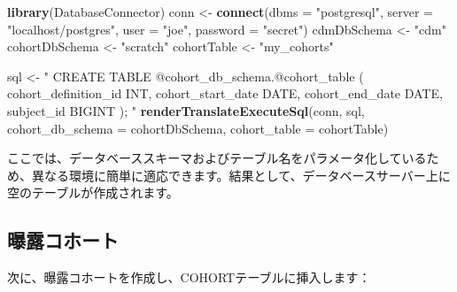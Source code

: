 \documentclass[
  11pt]{book}
\newenvironment{Shaded}{\begin{snugshade}}{\end{snugshade}}
\newcommand{\AttributeTok}[1]{\textcolor[rgb]{0.13,0.29,0.53}{#1}}
\newcommand{\FunctionTok}[1]{\textcolor[rgb]{0.13,0.29,0.53}{\textbf{#1}}}
\newcommand{\NormalTok}[1]{#1}
\newcommand{\OtherTok}[1]{\textcolor[rgb]{0.56,0.35,0.01}{#1}}
\newcommand{\StringTok}[1]{\textcolor[rgb]{0.31,0.60,0.02}{#1}}
\theoremstyle{definition}
\theoremstyle{definition}
\theoremstyle{definition}
\theoremstyle{definition}
\theoremstyle{remark}
\begin{document}
\begin{Shaded}
\begin{Highlighting}[]
\FunctionTok{library}\NormalTok{(DatabaseConnector)}
\NormalTok{conn }\OtherTok{\textless{}{-}} \FunctionTok{connect}\NormalTok{(}\AttributeTok{dbms =} \StringTok{"postgresql"}\NormalTok{,}
                \AttributeTok{server =} \StringTok{"localhost/postgres"}\NormalTok{,}
                \AttributeTok{user =} \StringTok{"joe"}\NormalTok{,}
                \AttributeTok{password =} \StringTok{"secret"}\NormalTok{)}
\NormalTok{cdmDbSchema }\OtherTok{\textless{}{-}} \StringTok{"cdm"}
\NormalTok{cohortDbSchema }\OtherTok{\textless{}{-}} \StringTok{"scratch"}
\NormalTok{cohortTable }\OtherTok{\textless{}{-}} \StringTok{"my\_cohorts"}

\NormalTok{sql }\OtherTok{\textless{}{-}} \StringTok{"}
\StringTok{CREATE TABLE @cohort\_db\_schema.@cohort\_table (}
\StringTok{  cohort\_definition\_id INT,}
\StringTok{  cohort\_start\_date DATE,}
\StringTok{  cohort\_end\_date DATE,}
\StringTok{  subject\_id BIGINT}
\StringTok{);}
\StringTok{"}
\FunctionTok{renderTranslateExecuteSql}\NormalTok{(conn, sql,}
                          \AttributeTok{cohort\_db\_schema =}\NormalTok{ cohortDbSchema,}
                          \AttributeTok{cohort\_table =}\NormalTok{ cohortTable)}
\end{Highlighting}
\end{Shaded}

ここでは、データベーススキーマおよびテーブル名をパラメータ化しているため、異なる環境に簡単に適応できます。結果として、データベースサーバー上に空のテーブルが作成されます。

\subsection{曝露コホート}\label{ux66ddux9732ux30b3ux30dbux30fcux30c8}

次に、曝露コホートを作成し、COHORTテーブルに挿入します：
\end{document}
